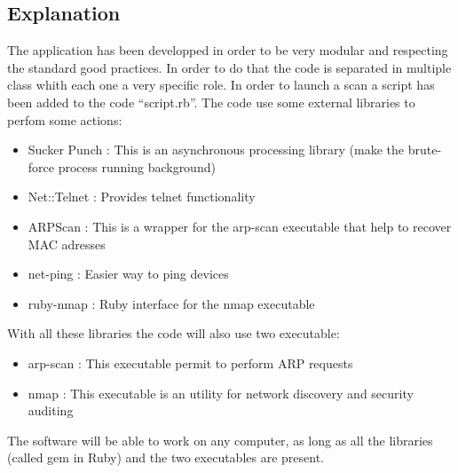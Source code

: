 \documentclass{report}
\begin{document}
\subsection{Explanation}
The application has been developped in order to be very modular and respecting the standard good practices. In order to do that the code is separated in multiple class whith each one a very specific role. In order to launch a scan a script has been added to the code ``script.rb''.\newline
The code use some external libraries to perfom some actions:
\begin{itemize}
 \item Sucker Punch \autocite{suckerpunch}: This is an asynchronous processing library (make the brute-force process running background)
 \item Net::Telnet \autocite{nettelnet}: Provides telnet functionality
 \item ARPScan \autocite{arpscan}: This is a wrapper for the arp-scan executable that help to recover MAC adresses
 \item net-ping \autocite{netping}: Easier way to ping devices
 \item ruby-nmap \autocite{rubynmap}: Ruby interface for the nmap executable
\end{itemize}
With all these libraries the code will also use two executable:
\begin{itemize}
 \item arp-scan \autocite{arp-scan}: This executable permit to perform ARP requests
 \item nmap \autocite{nmap}: This executable is an utility for network discovery and security auditing
\end{itemize}
The software will be able to work on any computer, as long as all the libraries (called gem in Ruby) and the two executables are present.
\end{document}

